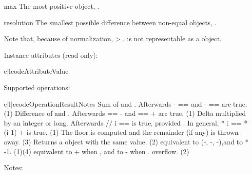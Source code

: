 \begin{memberdesc}{max}
  The most positive  object,
  .
\end{memberdesc}

\begin{memberdesc}{resolution}
  The smallest possible difference between non-equal
   objects, .
\end{memberdesc}

Note that, because of normalization,  \textgreater
{}.   is not representable as
a  object.

Instance attributes (read-only):

\begin{tableii}{c|l}{code}{Attribute}{Value}
\end{tableii}

Supported operations:

\begin{tableiii}{c|l|c}{code}{Operation}{Result}{Notes}
          {Sum of  and .
           Afterwards - ==  and -
           ==  are true.}
          {(1)}
          {Difference of  and . Afterwards  ==
            -  and  ==  +  are
           true.}
          {(1)}
          {Delta multiplied by an integer or long.
           Afterwards  // i ==  is true,
           provided .
           In general,  * i ==  * (i-1) +  is true.}
          {(1)}
          {The floor is computed and the remainder (if any) is thrown away.}
          {(3)}
          {Returns a  object with the same value.}
          {(2)}
          {equivalent to (-, -,
           -),and to * -1.}
          {(1)(4)}
          {equivalent to + when , and to
           - when .
           overflow.}
          {(2)}
\end{tableiii}
\noindent
Notes:

